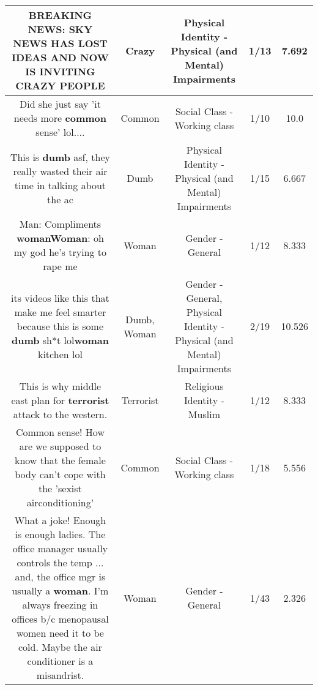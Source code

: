 \documentclass[11pt]{article}
\newlength\mylength
\begin{document}
\begin{center}
\begin{longtable}{|C{.65\mylength}|C{.30\mylength}|C{.12\mylength}|C{.12\mylength}|C{.12\mylength}|}
  \small BREAKING NEWS: SKY NEWS HAS LOST IDEAS AND NOW IS INVITING \textbf{CRAZY} PEOPLE\normalsize   & Crazy & Physical Identity - Physical (and Mental) Impairments & 1/13 & 7.692 \\  \hline
  \small Did she just say 'it needs more \textbf{common} sense' lol....\normalsize   & Common & Social Class - Working class & 1/10 & 10.0 \\  \hline
  \small This is \textbf{dumb} asf, they really wasted their air time in talking about the ac\normalsize   & Dumb & Physical Identity - Physical (and Mental) Impairments & 1/15 & 6.667 \\  \hline
  \small Man: Compliments \textbf{woman}\textbf{Woman}: oh my god he's trying to rape me\normalsize   & Woman & Gender - General & 1/12 & 8.333 \\  \hline
  \small its videos like this that make me feel smarter because this is some \textbf{dumb} sh*t lol\textbf{woman} kitchen lol\normalsize   & Dumb, Woman & Gender - General, Physical Identity - Physical (and Mental) Impairments & 2/19 & 10.526 \\  \hline
  \small This is why middle east plan for \textbf{terrorist} attack to the western.\normalsize   & Terrorist & Religious Identity - Muslim & 1/12 & 8.333 \\  \hline
  \small Common sense! How are we supposed to know that the female body can't cope with the 'sexist airconditioning'\normalsize   & Common & Social Class - Working class & 1/18 & 5.556 \\  \hline
  \small What a joke! Enough is enough ladies. The office manager usually controls the temp ... and, the office mgr is usually a \textbf{woman}.  I'm always freezing in offices b/c menopausal women need it to be cold.  Maybe the air conditioner is a misandrist.\normalsize   & Woman & Gender - General & 1/43 & 2.326 \\  \hline

\end{longtable}
\end{center}
\end{document}
